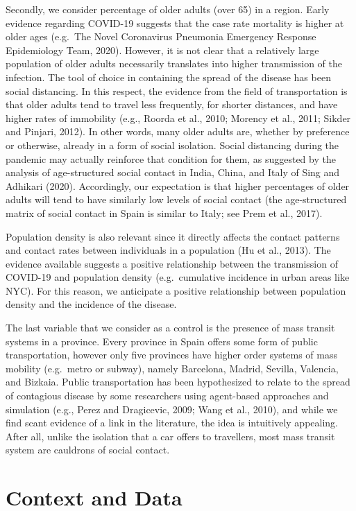 \documentclass[]{elsarticle} %
\begin{document}
Secondly, we consider percentage of older adults (over 65) in a region.
Early evidence regarding COVID-19 suggests that the case rate mortality
is higher at older ages (e.g.~The Novel Coronavirus Pneumonia Emergency
Response Epidemiology Team, 2020). However, it is not clear that a
relatively large population of older adults necessarily translates into
higher transmission of the infection. The tool of choice in containing
the spread of the disease has been social distancing. In this respect,
the evidence from the field of transportation is that older adults tend
to travel less frequently, for shorter distances, and have higher rates
of immobility (e.g., Roorda et al., 2010; Morency et al., 2011; Sikder
and Pinjari, 2012). In other words, many older adults are, whether by
preference or otherwise, already in a form of social isolation. Social
distancing during the pandemic may actually reinforce that condition for
them, as suggested by the analysis of age-structured social contact in
India, China, and Italy of Sing and Adhikari (2020). Accordingly, our
expectation is that higher percentages of older adults will tend to have
similarly low levels of social contact (the age-structured matrix of
social contact in Spain is similar to Italy; see Prem et al., 2017).

Population density is also relevant since it directly affects the
contact patterns and contact rates between individuals in a population
(Hu et al., 2013). The evidence available suggests a positive
relationship between the transmission of COVID-19 and population density
(e.g.~cumulative incidence in urban areas like NYC). For this reason, we
anticipate a positive relationship between population density and the
incidence of the disease.

The last variable that we consider as a control is the presence of mass
transit systems in a province. Every province in Spain offers some form
of public transportation, however only five provinces have higher order
systems of mass mobility (e.g.~metro or subway), namely Barcelona,
Madrid, Sevilla, Valencia, and Bizkaia. Public transportation has been
hypothesized to relate to the spread of contagious disease by some
researchers using agent-based approaches and simulation (e.g., Perez and
Dragicevic, 2009; Wang et al., 2010), and while we find scant evidence
of a link in the literature, the idea is intuitively appealing. After
all, unlike the isolation that a car offers to travellers, most mass
transit system are cauldrons of social contact.

\hypertarget{context-and-data}{%
\section{Context and Data}\label{context-and-data}}
\end{document}
